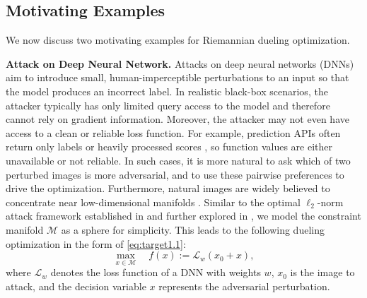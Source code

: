 \documentclass{article}
\theoremstyle{plain}
\theoremstyle{definition}
\theoremstyle{remark}
\begin{document}
\subsection{Motivating Examples}\label{sec:example}

We now discuss two motivating examples for Riemannian dueling optimization. 

{\bf Attack on Deep Neural Network.}
Attacks on deep neural networks (DNNs) aim to introduce small, human-imperceptible perturbations to an input so that the model produces an incorrect label. In realistic black-box scenarios, the attacker typically has only limited query access to the model and therefore cannot rely on gradient information. Moreover, the attacker may not even have access to a clean or reliable loss function. For example, prediction APIs often return only labels or heavily processed scores \citep{xie2018, s.2018stochastic, athalye2018obfuscatedgradientsfalsesense}, so function values are either unavailable or not reliable. In such cases, it is more natural to ask which of two perturbed images is more adversarial, and to use these pairwise preferences to drive the optimization. %
Furthermore, natural images are widely believed to concentrate near low-dimensional manifolds \citep{ws04}. %
Similar to the optimal $\ell_2$-norm attack framework established in \citep{lyu2015unifiedgradientregularizationfamily} and further explored in \citep{li2023stochastic}, we model the constraint manifold $\mathcal{M}$ as a sphere for simplicity. %
This leads to the following dueling optimization in the form of \eqref{eq:target1.1}:
\begin{equation*}
    \max_{x \in \mathcal{M}} \quad f(x) := \mathcal{L}_{w}(x_0 + x),
\end{equation*}
where $\mathcal{L}_w$ denotes the loss function of a DNN with weights $w$, $x_0$ is the image to attack, and the decision variable $x$ represents the adversarial perturbation. %
\end{document}
